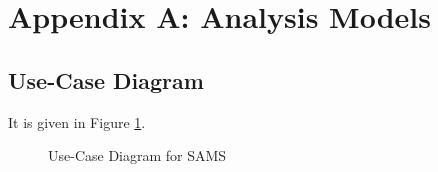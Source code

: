 \documentclass{scrreprt}
\begin{document}
\section{Appendix A: Analysis Models}

\subsection{Use-Case Diagram}
It is given in Figure \ref{fig:use-case}.
\begin{figure}
	\centering
	\caption{Use-Case Diagram for SAMS}
	\label{fig:use-case}
\end{figure}
\end{document}
